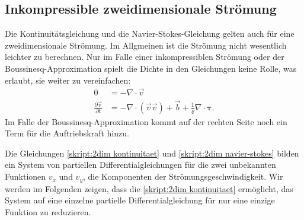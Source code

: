 
\subsection{Inkompressible zweidimensionale Strömung}
Die Kontinuitätsgleichung
und die Navier-Stokes-Gleichung gelten auch für eine zweidimensionale
Strömung.
Im Allgmeinen ist die Strömung nicht wesentlich leichter zu berechnen.
Nur im Falle einer inkompressiblen Strömung oder der Boussinesq-Approximation
spielt die Dichte in den Gleichungen keine Rolle, was erlaubt,
sie weiter zu vereinfachen:
\begin{align}
0
&=
-\nabla\cdot\vec v
\label{skript:2dim kontinuitaet}
\\
\frac{\partial \vec{v}}{\partial t}
&=
-\nabla\cdot(\vec{v}\vec{v})+\vec b + \frac1{\varrho}\nabla\cdot\bm{\tau}.
\label{skript:2dim navier-stokes}
\end{align}
Im Falle der Boussinesq-Approximation kommt auf der rechten Seite noch
ein Term für die Auftriebskraft hinzu.

Die Gleichungen
\eqref{skript:2dim kontinuitaet}
und
\eqref{skript:2dim navier-stokes}
bilden ein System von partiellen Differentialgleichungen für die zwei
unbekannten Funktionen $v_x$ und $v_y$, die Komponenten der 
Strömungsgeschwindigkeit.
Wir werden im Folgenden zeigen, dass die 
\eqref{skript:2dim kontinuitaet}
ermöglicht, das System auf eine einzelne partielle Differentialgleichung
für nur eine einzige Funktion zu reduzieren.

